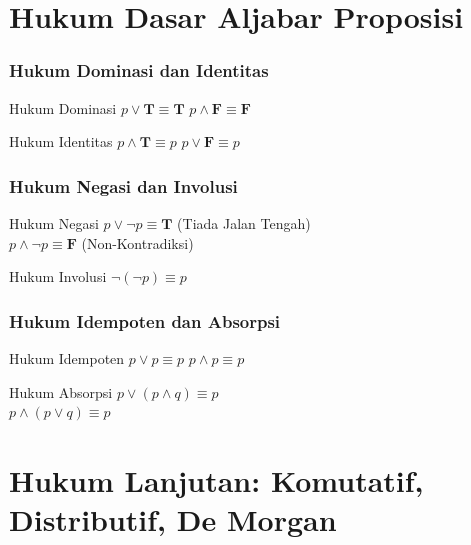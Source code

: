 \documentclass[handout]{beamer}
\theoremstyle{definition}
\theoremstyle{example}
\begin{document}
\section{Hukum Dasar Aljabar Proposisi}

\begin{frame}
\frametitle{Hukum Dominasi dan Identitas}
\begin{block}{Hukum Dominasi}
$p \vee \mathbf{T} \equiv \mathbf{T}$ \quad $p \wedge \mathbf{F} \equiv \mathbf{F}$
\end{block}
\begin{block}{Hukum Identitas}
$p \wedge \mathbf{T} \equiv p$ \quad $p \vee \mathbf{F} \equiv p$
\end{block}
\end{frame}

\begin{frame}
\frametitle{Hukum Negasi dan Involusi}
\begin{block}{Hukum Negasi}
$p \vee \neg p \equiv \mathbf{T}$ \quad (Tiada Jalan Tengah)\\
$p \wedge \neg p \equiv \mathbf{F}$ \quad (Non-Kontradiksi)
\end{block}
\begin{block}{Hukum Involusi}
$\neg(\neg p) \equiv p$
\end{block}
\end{frame}

\begin{frame}
\frametitle{Hukum Idempoten dan Absorpsi}
\begin{block}{Hukum Idempoten}
$p \vee p \equiv p$ \quad $p \wedge p \equiv p$
\end{block}
\begin{block}{Hukum Absorpsi}
$p \vee (p \wedge q) \equiv p$\\
$p \wedge (p \vee q) \equiv p$
\end{block}
\end{frame}

\section{Hukum Lanjutan: Komutatif, Distributif, De Morgan}
\end{document}
